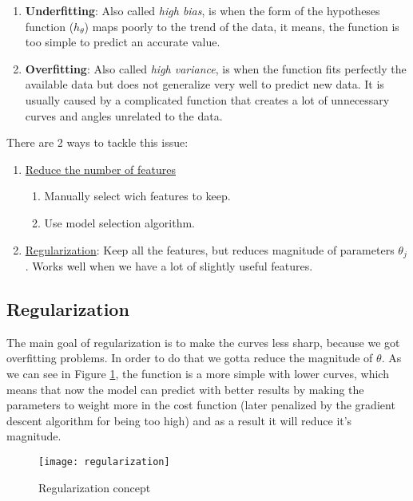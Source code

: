 \begin{enumerate}[label=\arabic*.]
	\item \textbf{Underfitting}: Also called \textit{high bias}, is when the form of the hypotheses function ($h_{\theta}$) maps poorly to the trend of the data, it means, the function is too simple to predict an accurate value.
	\item \textbf{Overfitting}: Also called \textit{high variance}, is when the function fits perfectly the available data but does not generalize very well to predict new data. It is usually caused by a complicated function that creates a lot of unnecessary curves and angles unrelated to the data.
\end{enumerate}

There are 2 ways to tackle this issue:
\begin{enumerate}[label=\arabic*.]
	\item \underline{Reduce the number of features}
	\begin{enumerate}[label=\textbullet]
		\item Manually select wich features to keep.
		\item Use model selection algorithm.
	\end{enumerate}
	\item \underline{Regularization}: Keep all the features, but reduces magnitude of parameters $\theta_j$. Works well when we have a lot of slightly useful features.

\end{enumerate}

\subsection{Regularization}
The main goal of regularization is to make the curves less sharp, because we got overfitting problems. In order to do that we gotta reduce the magnitude of $\theta$. As we can see in Figure \ref{fig:regularization}, the function is a more simple with lower curves, which means that now the model can predict with better results by making the parameters to weight more in the cost function (later penalized by the gradient descent algorithm for being too high) and as a result it will reduce it's magnitude.

\begin{figure}[h]
	\centering
	\texttt{[image: regularization]}
	\caption{Regularization concept}
	\label{fig:regularization}
\end{figure}

